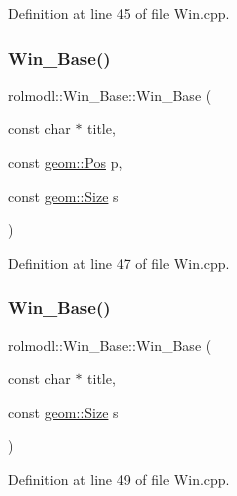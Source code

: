 Definition at line 45 of file Win.\+cpp.

\mbox{\label{classrolmodl_1_1_win___base_a520190cbd5064e620f0fca89eaae6f06}} 
\subsubsection{\texorpdfstring{Win\_Base()}{Win\_Base()}\hspace{0.1cm}{\footnotesize\ttfamily [3/6]}}
{\footnotesize\ttfamily rolmodl\+::\+Win\+\_\+\+Base\+::\+Win\+\_\+\+Base (\begin{DoxyParamCaption}\item[{const char $\ast$}]{title,  }\item[{const \mbox{\hyperlink{structrolmodl_1_1geom_1_1_pos}{geom\+::\+Pos}}}]{p,  }\item[{const \mbox{\hyperlink{structrolmodl_1_1geom_1_1_size}{geom\+::\+Size}}}]{s }\end{DoxyParamCaption})}



Definition at line 47 of file Win.\+cpp.

\mbox{\label{classrolmodl_1_1_win___base_afb98cea3cee1b466a4bb51d275123238}} 
\subsubsection{\texorpdfstring{Win\_Base()}{Win\_Base()}\hspace{0.1cm}{\footnotesize\ttfamily [4/6]}}
{\footnotesize\ttfamily rolmodl\+::\+Win\+\_\+\+Base\+::\+Win\+\_\+\+Base (\begin{DoxyParamCaption}\item[{const char $\ast$}]{title,  }\item[{const \mbox{\hyperlink{structrolmodl_1_1geom_1_1_size}{geom\+::\+Size}}}]{s }\end{DoxyParamCaption})}



Definition at line 49 of file Win.\+cpp.

\mbox{\label{classrolmodl_1_1_win___base_a42f630fc07be4c39c9fb424bfbf5d398}} 
